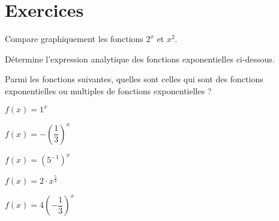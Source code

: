 \documentclass[a4paper,12pt,singlepage]{report}
\begin{document}
\section{Exercices}
\label{sec:org563f14c}
\begin{exercice}
Compare graphiquement les fonctions \(2^x\) et \(x^2\).
\end{exercice}

\begin{exercice}
Détermine l’expression analytique des fonctions exponentielles ci-dessous.


\end{exercice}

\begin{exercice}
Parmi les fonctions suivantes, quelles sont celles qui sont des fonctions
exponentielles ou multiples de fonctions exponentielles ?

\par \setlength{\columnseprule}{0 pt}
          \begin{minipage}[t]{\linewidth}
          \begin{multicols}{5}

\(f(x)=1^x\)

\columnbreak

\(f(x)=-\left(\dfrac{1}{3}\right)^x\)

\columnbreak

\(f(x)=(5^{-1})^x\)

\columnbreak

\(f(x)=2\cdot x^{\frac{5}{3}}\)

\columnbreak

\(f(x)=4\left(-\dfrac{1}{3}\right)^x\)




\end{multicols}\end{minipage}
\end{exercice}
\end{document}

